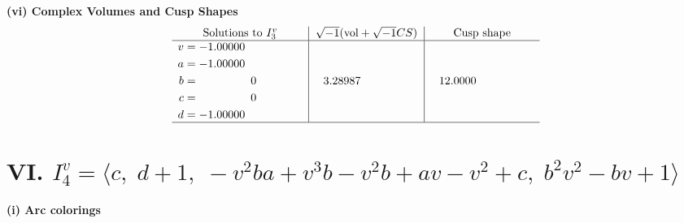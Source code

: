 \documentclass[1p]{elsarticle_modified}
\theoremstyle{definition}
\newcommand{\I}{\sqrt{-1}}
\begin{document}
\newpage\flushleft \textbf{(vi) Complex Volumes and Cusp Shapes}
$$\begin{array}{c|c|c}  
\text{Solutions to }I^v_{3}& \I (\text{vol} + \sqrt{-1}CS) & \text{Cusp shape}\\
 \hline 
\begin{aligned}
v &= -1.00000\phantom{ +0.000000I} \\
a &= -1.00000\phantom{ +0.000000I} \\
b &= \phantom{-0.000000 } 0 \\
c &= \phantom{-0.000000 } 0 \\
d &= -1.00000\phantom{ +0.000000I}\end{aligned}
 & \phantom{-}3.28987\phantom{ +0.000000I} & \phantom{-}12.0000\phantom{ +0.000000I}\\
 \hline 
 \end{array}$$\newpage\newpage\renewcommand{\arraystretch}{1}
\centering \section*{VI. $I^v_{4}= \langle c,\;d+1,\;- v^2 b a+v^3 b- v^2 b+a v- v^2+c,\;b^2 v^2- b v+1 \rangle$}
\flushleft \textbf{(i) Arc colorings}\\
\end{document}
